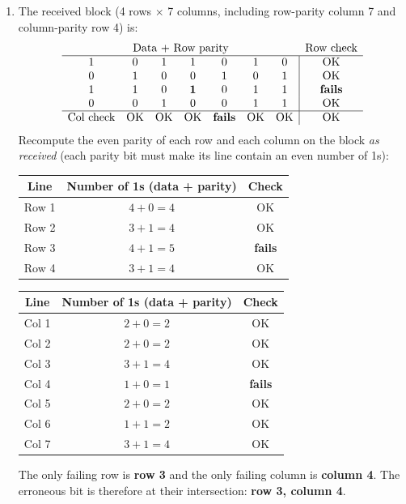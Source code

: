 \documentclass[11pt]{article}
\begin{document}
\begin{corrige}
\begin{enumerate}
\item The received block (4 rows $\times$ 7 columns, including row-parity column 7 and column-parity row 4) is:
\[
\begin{array}{ccccccc|c}
\multicolumn{7}{c}{\text{Data + Row parity}} & \text{Row check} \\
\hline
1 & 0 & 1 & 1 & 0 & 1 & 0 & \text{OK} \\
0 & 1 & 0 & 0 & 1 & 0 & 1 & \text{OK} \\
1 & 1 & 0 & \mathbf{1} & 0 & 1 & 1 & \textbf{fails} \\
0 & 0 & 1 & 0 & 0 & 1 & 1 & \text{OK} \\
\hline
\text{Col check} & \text{OK} & \text{OK} & \text{OK} & \textbf{fails} & \text{OK} & \text{OK} & \text{OK}
\end{array}
\]
Recompute the even parity of each row and each column on the block \emph{as received} (each parity bit must make its line contain an even number of 1s):
\begin{center}
\begin{tabular}{|c|c|c|}
\hline
\rowcolor{popblueL} Line & Number of 1s (data + parity) & Check \\
\hline
Row 1 & $4 + 0 = 4$ & OK \\
\hline
Row 2 & $3 + 1 = 4$ & OK \\
\hline
Row 3 & $4 + 1 = 5$ & \textbf{fails} \\
\hline
Row 4 & $3 + 1 = 4$ & OK \\
\hline
\end{tabular}
\qquad
\begin{tabular}{|c|c|c|}
\hline
\rowcolor{popblueL} Line & Number of 1s (data + parity) & Check \\
\hline
Col 1 & $2 + 0 = 2$ & OK \\
\hline
Col 2 & $2 + 0 = 2$ & OK \\
\hline
Col 3 & $3 + 1 = 4$ & OK \\
\hline
Col 4 & $1 + 0 = 1$ & \textbf{fails} \\
\hline
Col 5 & $2 + 0 = 2$ & OK \\
\hline
Col 6 & $1 + 1 = 2$ & OK \\
\hline
Col 7 & $3 + 1 = 4$ & OK \\
\hline
\end{tabular}
\end{center}
The only failing row is \textbf{row 3} and the only failing column is \textbf{column 4}. The erroneous bit is therefore at their intersection: \textbf{row 3, column 4}.

\end{enumerate}
\end{corrige}
\end{document}

